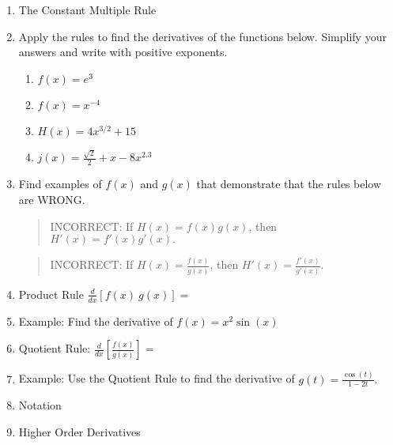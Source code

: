 \documentclass[11pt,fleqn]{article}
\begin{document}
\begin{enumerate}
\item The Constant Multiple Rule\\
\vfill

\newpage
\item Apply the rules to find the derivatives of the functions below. Simplify your answers and write with positive exponents.
	\begin{enumerate}
	\item $\displaystyle{f(x)=e^3}$\\
	\vfill

	\item $\displaystyle{f(x)=x^{-4}}$\\
		\vfill

	\item $\displaystyle{H(x)=4x^{3/2}+ 15}$\\
	\vfill

	\item $\displaystyle{j(x)=\frac{\sqrt{2}}{2}+x-8x^{2.3}}$\\
	\vfill

	\end{enumerate}
\item Find examples of $f(x)$ and $g(x)$ that demonstrate that the rules below are WRONG.\\
\begin{quote} INCORRECT: If $H(x)=f(x)g(x)$, then $H'(x)=f'(x)g'(x).$ \end{quote}
\vfill

\begin{quote} INCORRECT: If $H(x)=\frac{f(x)}{g(x)}$, then $H'(x)=\frac{f'(x)}{g'(x)}.$ \end{quote}
\vfill

\newpage
\item Product Rule  $\displaystyle{\frac{d}{dx}\left[f(x)\: g(x)\right]=}$\\
\vspace{.7in}

\item Example: Find the derivative of $f(x)=x^2\sin(x)$
\vfill
\item Quotient Rule: $\displaystyle{\frac{d}{dx}\left[\frac{f(x)}{g(x)}\right]=}$\\
\vspace{.7in}

\item Example: Use the Quotient Rule to find the derivative of $g(t)=\frac{\cos(t)}{1-2t}.$
\vfill
\item Notation\\
\vspace{.7in}
\item Higher Order Derivatives
\vspace{.7in}
\end{enumerate}
\end{document}
